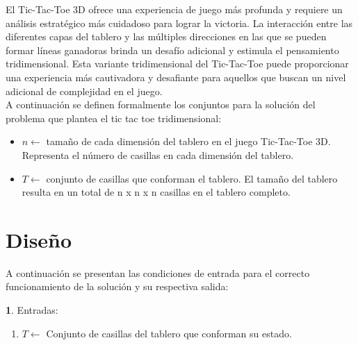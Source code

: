 \documentclass[oneside,spanish]{amsart}
\numberwithin{equation}{section}
\numberwithin{figure}{section}
\theoremstyle{definition}
\newtheorem*{defn*}{\protect\definitionname}
\providecommand{\definitionname}{Definición}
\begin{document}
El Tic-Tac-Toe 3D ofrece una experiencia de juego más profunda y requiere un análisis estratégico más cuidadoso para lograr la victoria. La interacción entre las diferentes capas del tablero y las múltiples direcciones en las que se pueden formar líneas ganadoras brinda un desafío adicional y estimula el pensamiento tridimensional. Esta variante tridimensional del Tic-Tac-Toe puede proporcionar una experiencia más cautivadora y desafiante para aquellos que buscan un nivel adicional de complejidad en el juego. \\

A continuación se definen formalmente los conjuntos para la solución del problema que plantea el tic tac toe tridimensional:\\

\begin{itemize}

    \item $n\leftarrow$ tamaño de cada dimensión del tablero en el juego Tic-Tac-Toe 3D. Representa el número de casillas en cada dimensión del tablero.\\

    \item $T\leftarrow$ conjunto de casillas que conforman el tablero.  El tamaño del tablero resulta en un total de n x n x n casillas en el tablero completo.\\

\end{itemize}

\section{Diseño}

A continuación se presentan las condiciones de entrada para el correcto funcionamiento de la solución y su respectiva salida: \\

\begin{defn*}

Entradas: \\

\begin{enumerate}

    \item $T\leftarrow$ Conjunto de casillas del tablero que conforman su estado.\\
    

\end{enumerate}

\end{defn*}
~~~~
\end{document}
